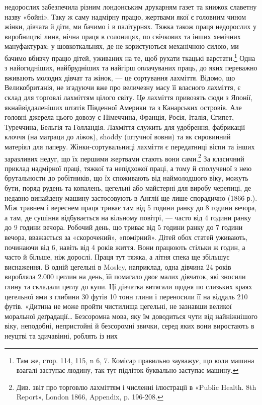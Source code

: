 \parcont{}  %
недорослих забезпечила різним лондонським друкарням газет
та книжок славетну назву «бойні». Таку ж саму надмірну
працю, жертвами якої є головним чином жінки, дівчата й діти,
ми бачимо і в палітурнях. Тяжка також праця недорослих у
виробництві линв, нічна праця в солоницях, по свічкових та інших
хемічних мануфактурах; у шовкоткальнях, де не користуються
механічною силою, ми бачимо вбивчу працю дітей, уживаних на
те, щоб рухати ткацькі варстати.\footnote{
Там же, стор. 114, 115, n 6, 7. Комісар правильно зауважує,
що коли машина взагалі заступає людину, так тут підліток буквально
заступає машину.
} Одна з найогидніших, найбрудніших
та найгірш оплачуваних праць, до яких переважно
вживають молодих дівчат та жінок, — це сортування лахміття.
Відомо, що Великобританія, не згадуючи вже про величезну масу
її власного лахміття, є склад для торговлі лахміттям цілого світу.
Це лахміття привозять сюди з Японії, якнайвіддаленіших штатів
Південної Америки та з Канарських островів. Але головні джерела
цього довозу є Німеччина, Франція, Росія, Італія, Єгипет,
Туреччина, Бельгія та Голландія. Лахміття служить для
удобрення, фабрикації клоччя (на матраци до ліжок), shoddy
(штучної вовни) та як сировинний матеріял для паперу. Жінки-сортувальниці
лахміття є передатниці віспи та інших заразливих
недуг, що їх першими жертвами стають вони сами.\footnote{
Див. звіт про торговлю лахміттям і численні ілюстрації в «Public
Health. 8th Report», London 1866, Appendix, p. 196-208.
} За класичний
приклад надмірної праці, тяжкої та непідхожої праці, а
тому й сполученої з нею брутальности до робітників, що їх споживають
від наймолодшого віку, можуть бути, поряд рудень та
копалень, цегельні або майстерні для виробу черепиці, де недавно
винайдену машину застосовують в Англії ще лише спорадично
(1866 р.). Між травнем і вереснем праця триває там від 5 години
ранку до 8 години вечора, а там, де сушіння відбувається на
вільному повітрі, — часто від 4 години ранку до 9 години вечора.
Робочий день, що триває від 5 години ранку до 7 години вечора,
вважається за «скорочений», «помірний». Дітей обох статей
уживають, починаючи від 6, навіть від 4 років життя. Вони працюють
стільки ж годин, а часто й більше, ніж дорослі. Праця
тут тяжка, а літня спека ще збільшує виснаження. В одній цегельні
в Mosley, наприклад, одна дівчина 24 років виробляла
\num{2.000} цеглин на день, їй помагало двоє малих дівчаток, які зносили
глину та складали цеглу до купи. Ці дівчатка витягали
щодня по слизьких краях цегельної ями з глибини 30 футів 10 тонн
глини і переносили її на віддаль 210 футів. «Дитина не може
пройти чистилища цегельні, не зазнавши великої моральної
деґрадації\dots{} Безсоромна мова, яку їм доводиться чути від найніжнішого
віку, неподобні, непристойні й безсоромні звички, серед
яких вони виростають в неуцтві та здичавінні, роблять із них
\parbreak{}  %
